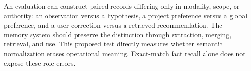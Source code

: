 An evaluation can construct paired records differing only in modality, scope, or authority: an observation versus a hypothesis, a project preference versus a global preference, and a user correction versus a retrieved recommendation. The memory system should preserve the distinction through extraction, merging, retrieval, and use. This proposed test directly measures whether semantic normalization erases operational meaning. Exact-match fact recall alone does not expose these role errors.

